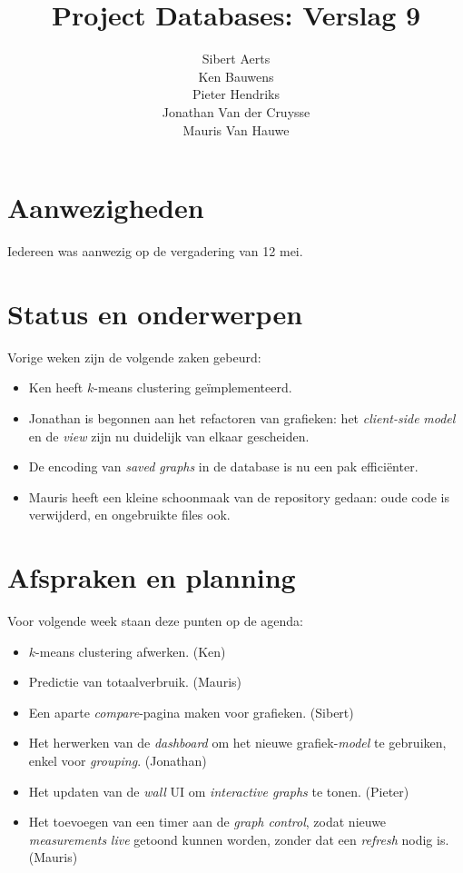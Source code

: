 \documentclass[10pt,a4paper]{article}
\author{Sibert Aerts\\
Ken Bauwens\\
Pieter Hendriks\\
Jonathan Van der Cruysse\\
Mauris Van Hauwe}
\title{Project Databases: Verslag 9}
\date{}
\begin{document}
  \maketitle
  \section{Aanwezigheden}
  Iedereen was aanwezig op de vergadering van 12 mei. 
  
  \section{Status en onderwerpen}
  
  Vorige weken zijn de volgende zaken gebeurd:
  
  \begin{itemize}
  	\item Ken heeft $k$-means clustering ge\"implementeerd.
  
	\item Jonathan is begonnen aan het refactoren van grafieken: het \emph{client-side} \emph{model} en de \emph{view} zijn nu duidelijk van elkaar gescheiden.
	
	\item De encoding van \emph{saved graphs} in de database is nu een pak effici\"enter.
	
	\item Mauris heeft een kleine schoonmaak van de repository gedaan: oude code is verwijderd, en ongebruikte files ook.
  
  \end{itemize}
  
  \section{Afspraken en planning}
  Voor volgende week staan deze punten op de agenda:
  
  \begin{itemize}
  	
  	\item $k$-means clustering afwerken. (Ken)
  	
  	\item Predictie van totaalverbruik. (Mauris)
  	
  	\item Een aparte \emph{compare}-pagina maken voor grafieken. (Sibert)
  	
  	\item Het herwerken van de \emph{dashboard} om het nieuwe grafiek-\emph{model} te gebruiken, enkel voor \emph{grouping}. (Jonathan)
  	
  	\item Het updaten van de \emph{wall} UI om \emph{interactive graphs} te tonen. (Pieter)
  	
  	\item Het toevoegen van een timer aan de \emph{graph control}, zodat nieuwe \emph{measurements} \emph{live} getoond kunnen worden, zonder dat een \emph{refresh} nodig is. (Mauris)
  	
  \end{itemize}
  
\end{document}
